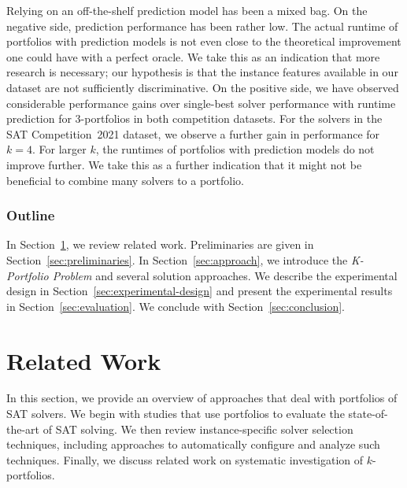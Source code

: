 \documentclass[conference]{IEEEtran}
\begin{document}
Relying on an off-the-shelf prediction model has been a mixed bag. 
On the negative side, prediction performance has been rather low. 
The actual runtime of portfolios with prediction models is not even close to the theoretical improvement one could have with a perfect oracle.
We take this as an indication that more research is necessary; our hypothesis is that the instance features available in our dataset are not sufficiently discriminative. 
On the positive side, we have observed considerable performance gains over single-best solver performance with runtime prediction for $3$-portfolios in both competition datasets. 
For the solvers in the SAT Competition~2021 dataset, we observe a further gain in performance for $k = 4$. 
For larger $k$, the runtimes of portfolios with prediction models do not improve further. 
We take this as a further indication that it might not be beneficial to combine many solvers to a portfolio. 

\subsubsection{Outline}

In Section~\ref{sec:related-work}, we review related work. 
Preliminaries are given in Section~\ref{sec:preliminaries}. 
In Section~\ref{sec:approach}, we introduce the \emph{K-Portfolio Problem} and several solution approaches. 
We describe the experimental design in Section~\ref{sec:experimental-design} and present the experimental results in Section~\ref{sec:evaluation}. 
We conclude with Section~\ref{sec:conclusion}. 

\section{Related Work}
\label{sec:related-work}

In this section, we provide an overview of approaches that deal with portfolios of SAT solvers. 
We begin with studies that use portfolios to evaluate the state-of-the-art of SAT solving. 
We then review instance-specific solver selection techniques, including approaches to automatically configure and analyze such techniques. 
Finally, we discuss related work on systematic investigation of $k$-portfolios. 
\end{document}
